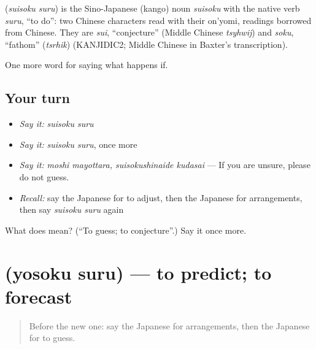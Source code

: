 \begin{cousinweb}
\textbf{} (\emph{suisoku suru}) is the Sino-Japanese (kango) noun \emph{suisoku} with the native verb \emph{suru}, \textquotedblleft{}to do\textquotedblright{}: two Chinese characters read with their on'yomi, readings borrowed from Chinese. They are \emph{sui}, \textquotedblleft{}conjecture\textquotedblright{} (Middle Chinese \emph{tsyhwij}) and \emph{soku}, \textquotedblleft{}fathom\textquotedblright{} (\emph{tsrhik}) (KANJIDIC2; Middle Chinese in Baxter's transcription).
\end{cousinweb}

\begin{grammarlens}[title={What you've built}]
One more word for saying what happens if.
\end{grammarlens}

\subsection*{Your turn}
\begin{itemize}
\raggedright
  \item \emph{Say it:} \emph{suisoku suru}
  \item \emph{Say it:} \emph{suisoku suru}, once more
  \item \emph{Say it:} \emph{moshi mayottara, suisokushinaide kudasai} — If you are unsure, please do not guess.
  \item \emph{Recall:} say the Japanese for to adjust, then the Japanese for arrangements, then say \emph{suisoku suru} again
\end{itemize}

\begin{tcolorbox}[breakable,colback=teal!4,colframe=teal!35!black,title={Before you move on}]
What does  mean? (\textquotedblleft{}To guess; to conjecture\textquotedblright{}.) Say it once more.
\end{tcolorbox}
\section[\texorpdfstring{\ja{よそくする} (yosoku suru)}{よそくする (yosoku suru)}]{ (yosoku suru) — to predict; to forecast}

\label{lesson:JA-C514-yosoku-suru}



\begin{quote}
Before the new one: say the Japanese for arrangements, then the Japanese for to guess.
\end{quote}


